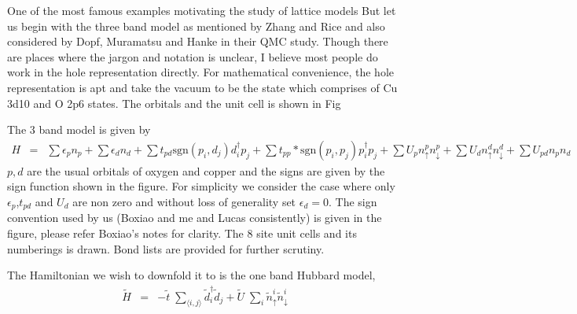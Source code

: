 \documentclass[prl,12pt,onecolumn,nofootinbib,notitlepage,english,superscriptaddress]{revtex4-1}
\newcommand{\HJC}[1]{{\color{RED}{\bf HJC: #1}}}
\begin{document}
\HJC{3 band has been downfolded to 1 band and t-J models near half filling... We will do it a new way etc etc}
One of the most famous examples motivating the study of lattice models 
But let us begin with the three band model as mentioned by
Zhang and Rice and also considered by Dopf, Muramatsu and
Hanke in their QMC study. Though there are places where the
jargon and notation is unclear, I believe most people do work
in the hole representation directly. For mathematical convenience,
the hole representation is apt and take the vacuum to
be the state which comprises of Cu 3d10 and O 2p6 states. The
orbitals and the unit cell is shown in Fig

The 3 band model is given by 
\begin{eqnarray}
H &=& \sum \epsilon_p n_p + \sum \epsilon_d n_d + \sum t_{pd} \text{sgn}(p_i,d_j) d_i^{\dagger} p_j + \sum t_{pp} * \text{sgn}(p_i,p_j) p_i^{\dagger} p_j + \sum U_p n^{p}_{\uparrow} n^{p}_{\downarrow} + \sum U_d n^{d}_{\uparrow} n^{d}_{\downarrow} + \sum U_{pd} n_p n_d 
\end{eqnarray}
$p,d$ are the usual orbitals of oxygen and copper and the signs are given by the sign function shown in the figure.  
For simplicity we consider the case where only $\epsilon_p$,$t_{pd}$ and $U_{d}$ are non zero and without loss of generality 
set $\epsilon_d = 0$. 
The sign convention used by us (Boxiao and me and Lucas consistently) is given in the figure, please refer Boxiao's notes for clarity.
The 8 site unit cells and its numberings is drawn. Bond lists are provided for further scrutiny.

\HJC{model we want to map it to...}
The Hamiltonian we wish to downfold it to is the one band Hubbard model, 
\begin{eqnarray}
	\tilde{H} &=&  -\tilde{t} \;\sum_{\langle i,j \rangle} \tilde{d}_i^{\dagger} \tilde{d}_j + \tilde{U}\;\sum_{i} \tilde{n}^{i}_{\uparrow} \tilde{n}^{i}_{\downarrow}
\end{eqnarray}
\end{document}
